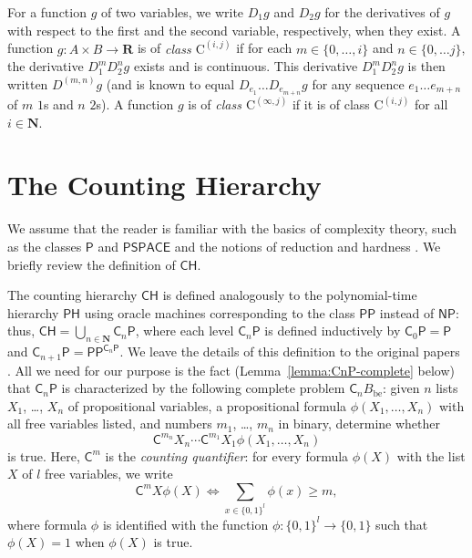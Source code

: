 \documentclass{lmcs}
\theoremstyle{definition}
\theoremstyle{remark}
\newcommand{\R}{\mathbf R}
\newcommand{\N}{\mathbf N}
\newcommand{\D}{D}
\newcommand{\classP}{\mathsf{P}}
\newcommand{\classPSPACE}{\mathsf{PSPACE}}
\newcommand{\classNP}{\mathsf{NP}}
\newcommand{\classPH}{\mathsf{PH}}
\newcommand{\classPP}{\mathsf{PP}}
\newcommand{\classCH}{\mathsf{CH}}
\newcommand{\quantC}{\mathsf{C}}
\newcommand{\classC}{\mathrm C}
\begin{document}
For a function $g$ of two variables, 
we write $\D _1 g$ and $\D _2 g$ for the derivatives of $g$ 
with respect to the first and the second variable,
respectively, 
when they exist.
A function $g \colon A \times B \to \R$ is of \emph{class $\classC^{(i, j)}$}
if for each $m \in \{0, \dots, i\}$ and $n \in \{0, \dots j\}$,
the derivative $\D_1^m \D_2^n g$ exists and is continuous.
This derivative $\D_1^m \D_2^n g$ is then written $\D ^{(m, n)} g$
(and is known to equal $\D _{e_1} \ldots \D _{e _{m + n}} g$ for any 
sequence $e _1 \ldots e _{m + n}$ of $m$ $1$s and $n$ $2$s). 
A function $g$ is of \emph{class $\classC^{(\infty, j)}$}
if it is of class $\classC^{(i, j)}$ for all $i \in \N$.

\section{The Counting Hierarchy}
\label{section: counting hierarchy}

We assume that the reader is familiar with 
the basics of complexity theory, 
such as the classes $\classP$ and $\classPSPACE$
and the notions of reduction and hardness 
\cite{wegener-book}. 
We brief\textcompwordmark ly review the definition of $\classCH$. 

The counting hierarchy $\classCH$ is defined analogously to 
the polynomial-time hierarchy $\classPH$ \cite[\S 10.4]{wegener-book} using 
oracle machines corresponding to the class $\classPP$ \cite[\S 3.3]{wegener-book}
instead of $\classNP$: 
thus, $\classCH = \bigcup _{n \in \N} \quantC _n \classP$, 
where each level $\quantC _n \classP$ is defined inductively by $
 \quantC_0 \classP  = \classP 
$ and $
 \quantC_{n+1} \classP = \classPP^{\quantC_n \classP}
$. 
We leave the details of this definition to 
the original papers~%
\cite{wagner1986complexity,parberry-schnitger,toran1991complexity}. 
All we need for our purpose is the fact (Lemma~\ref{lemma:CnP-complete} below) 
that $\quantC _n \classP$ 
is characterized by the following complete problem $\quantC_n B_{\mathrm{be}}$:
given $n$ lists $X _1$, \ldots, $X _n$ of propositional variables, 
a propositional formula $\phi (X _1, \dots, X _n)$ with all free variables listed, 
and numbers $m _1$, \ldots, $m _n$ in binary, 
determine whether 
\begin{equation}
 \quantC^{m_n}{X_n} \cdots \quantC^{m_1}{X_1} \phi(X_1, \dots, X_n)
\end{equation}
is true.  Here, $\quantC ^m$ is the \emph{counting quantifier}: 
for every formula $\phi(X)$ with the list $X$ of $l$ free variables,
we write 
\begin{equation}
 \quantC^m X \phi(X) 
  \iff 
  \sum_{x \in \{0,1\}^l} \phi(x) \ge m,
\end{equation}
where formula $\phi$ is identified with the function 
$\phi \colon \{0,1\}^l \to \{0,1\}$
such that $\phi(X) = 1$ when $\phi(X)$ is true.
\end{document}

